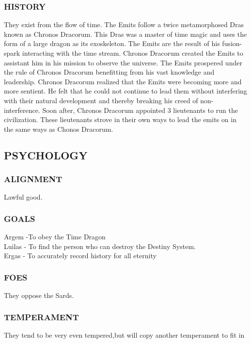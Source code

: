 \subsubsection{HISTORY}
They exist from the flow of time.  The Emits follow a twice metamorphosed Dras
known as Chronos Dracorum.  This Dras was a master of time magic and uses the
form of a large dragon as its exoskeleton.  The Emits are the result of his
fusion-spark interacting with the time stream.  Chronos Dracorum created the
Emits to assistant him in his mission to observe the universe.  The Emits
prospered under the rule of Chronos Dracorum benefitting from his vast
knowledge and leadership.  Chronos Dracorum realized that the Emits were
becoming more and more sentient.  He felt that he could not continue to lead
them without interfering with their natural development and thereby breaking
his creed of non-interference.  Soon after, Chronos Dracorum appointed 3
lieutenants to run the civilization.  These lieutenants strove in their own
ways to lead the emits on in the same ways as Chonos Dracorum.
\subsection{PSYCHOLOGY}
\subsubsection{ALIGNMENT}
Lawful good.
\subsubsection{GOALS}
Argem -To obey the Time Dragon\\
Luilas - To find the person who can destroy the Destiny System.\\
Ergas - To accurately record history for all eternity\\
\subsubsection{FOES}
They oppose the Sards.
\subsubsection{TEMPERAMENT}
They tend to be very even tempered,but will copy another temperament to fit in
